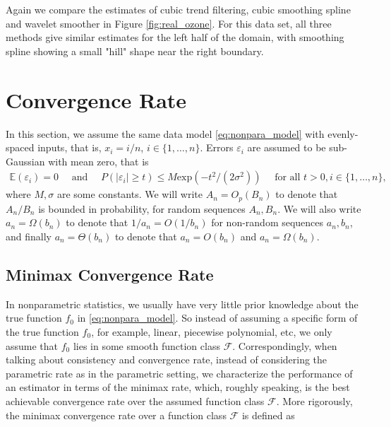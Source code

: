 \documentclass[a4paper]{article}
\renewcommand{\cal}{\mathcal}
\newcommand{\E}{\mathbb{E}}
\begin{document}
Again we compare the estimates of cubic trend filtering, cubic smoothing spline and wavelet smoother in Figure \ref{fig:real_ozone}. For this data set, all three methods give similar estimates for the left half of the domain, with smoothing spline showing a small "hill" shape near the right boundary.

\section{Convergence Rate}
\label{sec:theory}
In this section, we assume the same data model \eqref{eq:nonpara_model} with evenly-spaced inputs, that is, $x_i = i/n$, $i\in\{1,\ldots, n\}$. Errors $\varepsilon_i$ are assumed to be sub-Gaussian with mean zero, that is
\begin{align*}
\E(\varepsilon_i) = 0 \quad \text{ and } \quad P(|\varepsilon_i|\geq t) \leq M\mbox{exp}(-t^2/(2\sigma^2)) \quad \text{ for all } t>0, i\in\{1,\ldots, n\},
\end{align*}
where $M, \sigma$ are some constants. We will write $A_n = O_p(B_n)$ to denote that $A_n/B_n$ is bounded in probability, for random sequences $A_n,B_n$. We will also write $a_n = \Omega(b_n)$ to denote that $1/a_n = O(1/b_n)$ for non-random sequences $a_n, b_n$, and finally $a_n = \Theta(b_n)$ to denote that $a_n = O(b_n)$ and $a_n = \Omega(b_n)$.

\subsection{Minimax Convergence Rate}
\label{subsec:minimax_rate}
In nonparametric statistics, we usually have very little prior knowledge about the true function $f_0$ in \eqref{eq:nonpara_model}. So instead of assuming a specific form of the true function $f_0$, for example, linear, piecewise polynomial, etc, we only assume that $f_0$ lies in some smooth function class $\cal{F}$. Correspondingly, when talking about consistency and convergence rate, instead of considering the parametric rate as in the parametric setting, we characterize the performance of an estimator in terms of the minimax rate, which, roughly speaking, is the best achievable convergence rate over the assumed function class $\cal{F}$. More rigorously, the minimax convergence rate over a function class $\cal{F}$ is defined as
\end{document}

